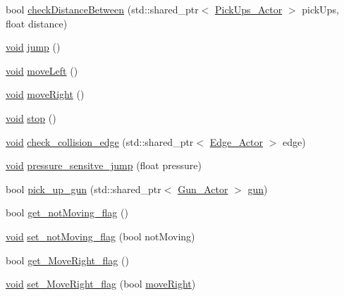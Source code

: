 \begin{DoxyCompactItemize}
\item 
bool \hyperlink{classPlayer__Actor_a7c6408496addd95b7c502f3c78916e95}{check\+Distance\+Between} (std\+::shared\+\_\+ptr$<$ \hyperlink{classPickUps__Actor}{Pick\+Ups\+\_\+\+Actor} $>$ pick\+Ups, float distance)
\item 
\hyperlink{imgui__impl__opengl3__loader_8h_ac668e7cffd9e2e9cfee428b9b2f34fa7}{void} \hyperlink{classPlayer__Actor_a7e08ea67f40c62b7db50d96a74c54be8}{jump} ()
\item 
\hyperlink{imgui__impl__opengl3__loader_8h_ac668e7cffd9e2e9cfee428b9b2f34fa7}{void} \hyperlink{classPlayer__Actor_a88fbeecef56bc4fffe695799b3ac2a7f}{move\+Left} ()
\item 
\hyperlink{imgui__impl__opengl3__loader_8h_ac668e7cffd9e2e9cfee428b9b2f34fa7}{void} \hyperlink{classPlayer__Actor_a95230d403ce0b9916033663bfed3c92b}{move\+Right} ()
\item 
\hyperlink{imgui__impl__opengl3__loader_8h_ac668e7cffd9e2e9cfee428b9b2f34fa7}{void} \hyperlink{classPlayer__Actor_aa9c0c6621795a8be312fb98a6ed4467e}{stop} ()
\item 
\hyperlink{imgui__impl__opengl3__loader_8h_ac668e7cffd9e2e9cfee428b9b2f34fa7}{void} \hyperlink{classPlayer__Actor_a5c4f8d2b8dadbd94d8f5f3eb2ce8f7ee}{check\+\_\+collision\+\_\+edge} (std\+::shared\+\_\+ptr$<$ \hyperlink{classEdge__Actor}{Edge\+\_\+\+Actor} $>$ edge)
\item 
\hyperlink{imgui__impl__opengl3__loader_8h_ac668e7cffd9e2e9cfee428b9b2f34fa7}{void} \hyperlink{classPlayer__Actor_a7bf2cb158a0d6fefb3e4818142046654}{pressure\+\_\+sensitve\+\_\+jump} (float pressure)
\item 
bool \hyperlink{classPlayer__Actor_a3ad2a23796a81a6167b1c44f068bc754}{pick\+\_\+up\+\_\+gun} (std\+::shared\+\_\+ptr$<$ \hyperlink{classGun__Actor}{Gun\+\_\+\+Actor} $>$ \hyperlink{game__play__state_8cpp_add80b8ad6081fe06bcfb1956a830b5fd}{gun})
\item 
bool \hyperlink{classPlayer__Actor_a38d08161772bcae9ab1c6de69daab20a}{get\+\_\+not\+Moving\+\_\+flag} ()
\item 
\hyperlink{imgui__impl__opengl3__loader_8h_ac668e7cffd9e2e9cfee428b9b2f34fa7}{void} \hyperlink{classPlayer__Actor_a97eb58ecad6e2543e620f3639d0566c5}{set\+\_\+not\+Moving\+\_\+flag} (bool not\+Moving)
\item 
bool \hyperlink{classPlayer__Actor_ac43536f1f7289a2a40f6ef506a38db09}{get\+\_\+\+Move\+Right\+\_\+flag} ()
\item 
\hyperlink{imgui__impl__opengl3__loader_8h_ac668e7cffd9e2e9cfee428b9b2f34fa7}{void} \hyperlink{classPlayer__Actor_acf7e3e4c67e48826e77d67ec5415606e}{set\+\_\+\+Move\+Right\+\_\+flag} (bool \hyperlink{classPlayer__Actor_a95230d403ce0b9916033663bfed3c92b}{move\+Right})

\end{DoxyCompactItemize}
